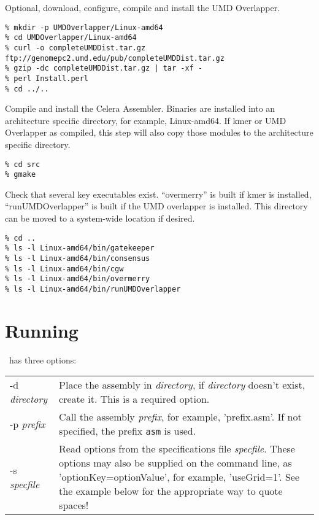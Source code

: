 \documentclass[twoside,11pt]{article}
\begin{document}
Optional, download, configure, compile and install the UMD Overlapper.

\begin{verbatim}
% mkdir -p UMDOverlapper/Linux-amd64
% cd UMDOverlapper/Linux-amd64
% curl -o completeUMDDist.tar.gz ftp://genomepc2.umd.edu/pub/completeUMDDist.tar.gz
% gzip -dc completeUMDDist.tar.gz | tar -xf -
% perl Install.perl
% cd ../..
\end{verbatim}

Compile and install the Celera Assembler.  Binaries are installed into
an architecture specific directory, for example, Linux-amd64.  If kmer
or UMD Overlapper as compiled, this step will also copy those modules
to the architecture specific directory.

\begin{verbatim}
% cd src
% gmake
\end{verbatim}

Check that several key executables exist.  ``overmerry'' is built if
kmer is installed, ``runUMDOverlapper'' is built if the UMD overlapper
is installed.  This directory can be moved to a system-wide location
if desired.

\begin{verbatim}
% cd ..
% ls -l Linux-amd64/bin/gatekeeper
% ls -l Linux-amd64/bin/consensus
% ls -l Linux-amd64/bin/cgw
% ls -l Linux-amd64/bin/overmerry
% ls -l Linux-amd64/bin/runUMDOverlapper
\end{verbatim}

\section{Running}

\runCA\ has three options:

\begin{longtable}{lp{3.0in}}
-d {\it directory} &
Place the assembly in {\it directory}, if {\it directory} doesn't exist,
create it.  This is a required option.
\\
-p {\it prefix} &
Call the assembly {\it prefix}, for example, 'prefix.asm'.  If not
specified, the prefix {\tt asm} is used.
\\
-s {\it specfile} &
Read options from the specifications file {\it specfile}.  These
options may also be supplied on the command line, as
'optionKey=optionValue', for example, 'useGrid=1'.  See the example
below for the appropriate way to quote spaces!
\end{longtable}
\end{document}
